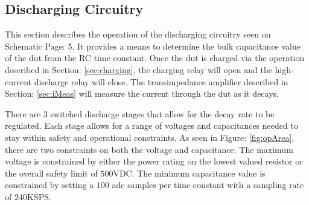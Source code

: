 \subsection{Discharging Circuitry}

This section describes the operation of the discharging circuitry seen on Schematic Page: 5. It provides a means to determine the bulk capacitance value of the \gls{dut} from the RC time constant. Once the \gls{dut} is charged via the operation described in Section: \ref{sec:charging}, the charging relay will open and the high-current discharge relay will close. The transimpedance amplifier described in Section: \ref{sec:iMeas} will measure the current through the \gls{dut} as it decays.

There are 3 switched discharge stages that allow for the decay rate to be regulated. Each stage allows for a range of voltages and capacitances needed to stay within safety and operational constraints. As seen in Figure: \ref{fig:opArea}, there are two constraints on both the voltage and capacitance. The maximum voltage is constrained by either the power rating on the lowest valued resistor or the overall safety limit of $500$VDC. The minimum capacitance value is constrained by setting a $100$ \gls{adc} samples per time constant with a sampling rate of $240$KSPS.



